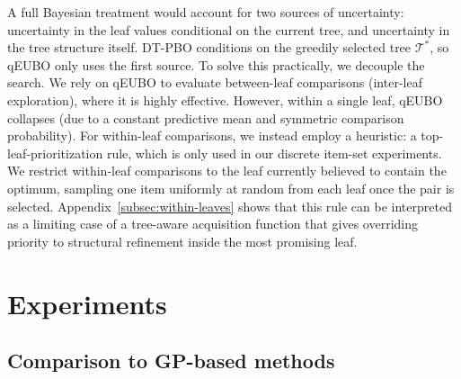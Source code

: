\documentclass{article}
\begin{document}
A full Bayesian treatment would account for two sources of uncertainty: uncertainty in the leaf values conditional on the current tree, and uncertainty in the tree structure itself. DT-PBO conditions on the greedily selected tree $\mathcal{T}^*$, so qEUBO only uses the first source. To solve this practically, we decouple the search. We rely on qEUBO to evaluate between-leaf comparisons (inter-leaf exploration), where it is highly effective. However, within a single leaf, qEUBO collapses (due to a constant predictive mean and symmetric comparison probability). For within-leaf comparisons, we instead employ a heuristic: a top-leaf-prioritization rule, which is only used in our discrete item-set experiments. We restrict within-leaf comparisons to the leaf currently believed to contain the optimum, sampling one item uniformly at random from each leaf once the pair is selected.  Appendix~\ref{subsec:within-leaves} shows that this rule can be interpreted as a limiting case of a tree-aware acquisition function that gives overriding priority to structural refinement inside the most promising leaf.




\section{Experiments}\label{sec:numerical_exp}
\subsection{Comparison to GP-based methods}
\end{document}
